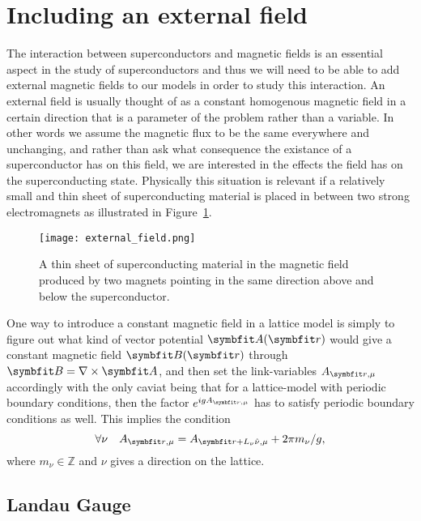 \section{Including an external field}
\label{sec:LM:Field}

The interaction between superconductors and magnetic fields is an essential aspect in the study of superconductors and thus we will need to be able to add external magnetic fields
to our models in order to study this interaction. An external field is usually thought of as a constant homogenous magnetic field in a certain direction that is a parameter of
the problem rather than a variable. In other words we assume the magnetic flux to be the same everywhere and unchanging, and rather than ask what consequence the existance of a superconductor
has on this field, we are interested in the effects the field has on the superconducting state. Physically this situation is relevant \eg if a relatively small and thin sheet
of superconducting material is placed in between two strong electromagnets as illustrated in Figure~\ref{fig:LM:Field:externalField}.
\begin{figure}[t]
    \centering
    \texttt{[image: external\_field.png]}
    \caption{A thin sheet of superconducting material in the magnetic field produced by two magnets pointing in the same direction above and below the superconductor.}
    \label{fig:LM:Field:externalField}
\end{figure}

One way to introduce a constant magnetic field in a lattice model is simply to figure out what kind of vector potential $\v{A}(\v{r})$ would give a constant magnetic field $\v{B}(\v{r})$
through $\v{B} = \nabla\times\v{A}$, and then set the link-variables $A_{\v{r},\mu}$ accordingly with the only caviat being that for a lattice-model with periodic boundary conditions,
then the factor $e^{igA_{\v{r},\mu}}$ has to satisfy periodic boundary conditions as well. This implies the condition
\begin{equation}
    \label{eq:LM:Field:periodicBC}
    \forall\nu\quad A_{\v{r},\mu} = A_{\v{r}+L_\nu\hat{\nu},\mu} + 2\pi m_\nu/g,
\end{equation}
where $m_\nu\in\mathbb{Z}$ and $\nu$ gives a direction on the lattice.

\subsection{Landau Gauge}
\label{sec:LM:Field:LandauGauge}

